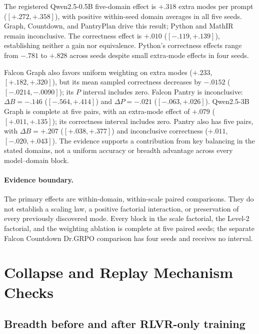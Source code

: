 \documentclass{article}
\newcommand{\1}{\mathbf 1}
\theoremstyle{remark}
\theoremstyle{definition}
\theoremstyle{plain}
\begin{document}
The registered Qwen2.5-0.5B five-domain effect is $+.318$ extra modes per
prompt ($[+.272,+.358]$), with positive within-seed domain averages in all
five seeds. Graph, Countdown, and PantryPlan drive this result; Python and
MathIR remain inconclusive. The correctness effect is $+.010$
($[-.119,+.139]$), establishing neither a gain nor equivalence. Python's
correctness effects range from $-.781$ to $+.828$ across seeds despite
small extra-mode effects in four seeds.

Falcon Graph also favors uniform weighting on extra modes ($+.233$,
$[+.182,+.320]$), but its mean sampled correctness decreases by $-.0152$
($[-.0214,-.0090]$); its $P$ interval includes zero. Falcon Pantry is
inconclusive: $\Delta B=-.146$ ($[-.564,+.414]$) and $\Delta P=-.021$
($[-.063,+.026]$). Qwen2.5-3B Graph is complete at five pairs, with an extra-mode effect of
$+.079$ ($[+.011,+.135]$); its correctness interval includes zero.
Pantry also has five pairs, with $\Delta B=+.207$
($[+.038,+.377]$) and inconclusive correctness ($+.011$, $[-.020,+.043]$).
The evidence supports a contribution from key balancing in the stated domains, not a
uniform accuracy or breadth advantage across every model--domain block.

\paragraph{Evidence boundary.}
\label{app:scale-boundary}
The primary effects are within-domain, within-scale paired comparisons.
They do not establish a scaling law, a positive factorial interaction, or
preservation of every previously discovered mode. Every block in the scale
factorial, the Level-2 factorial, and the weighting ablation is complete at
five paired seeds; the separate Falcon Countdown Dr.GRPO comparison has four
seeds and receives no interval.



\section{Collapse and Replay Mechanism Checks}
\label{app:ablations}




\subsection{Breadth before and after RLVR-only training}
\label{app:pre-rl-regression}
\end{document}
